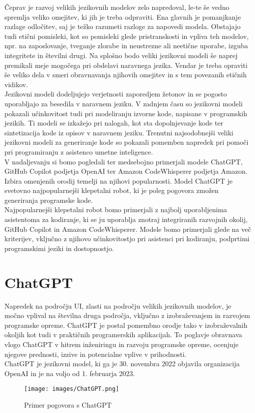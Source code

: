 \documentclass[a4paper,12pt,openright]{book}
\begin{document}
Čeprav je razvoj velikih jezikovnih modelov zelo napredoval, le-te še vedno spremlja veliko omejitev, ki jih je treba odpraviti. Ena glavnih je pomanjkanje razlage odločitev, saj je težko razumeti razloge za napovedi modela. Obstajajo tudi etični pomisleki, kot so pomisleki glede pristranskosti in vpliva teh modelov, npr. na zaposlovanje, tveganje zlorabe in neustrezne ali neetične uporabe, izguba integritete in številni drugi. Na splošno bodo veliki jezikovni modeli še naprej premikali meje mogočega pri obdelavi naravnega jezika. Vendar je treba opraviti še veliko dela v smeri obravnavanja njihovih omejitev in s tem povezanih etičnih vidikov.\cite{KASNECI2023102274} \\
Jezikovni modeli dodeljujejo verjetnosti zaporedjem žetonov in se pogosto uporabljajo za besedila v naravnem jeziku. V zadnjem času so jezikovni modeli pokazali učinkovitost tudi pri modeliranju izvorne kode, napisane v programskih jezikih. Ti modeli se izkažejo pri nalogah, kot sta dopolnjevanje kode ter sintetizacija kode iz opisov v naravnem jeziku.
Trenutni najsodobnejši veliki jezikovni modeli za generiranje kode so pokazali pomemben napredek pri pomoči pri programiranju z asistenco umetne inteligence.  \cite{vaswani2023attention} \\
V nadaljevanju si bomo pogledali ter medsebojno primerjali modele ChatGPT, GitHub Copilot podjetja OpenAI ter Amazon CodeWhisperer podjetja Amazon. Izbira omenjenih orodij temelji na njihovi popularnosti. Model ChatGPT je svetovno najpopularnejši klepetalni robot, ki je poleg pogovora zmožen generiranja programske kode\cite{wu2023brief}. \\
Najpopularnejši klepetalni robot bomo primerjali z najbolj uporabljenima asistentoma za kodiranje, ki se ju uporablja znotraj integriranih razvojnih okolij, GitHub Copilot in Amazon CodeWhisperer. Modele bomo primerjali glede na več kriterijev, vključno z njihovo učinkovitostjo pri asistenci pri kodiranju, podprtimi programskimi jeziki in dostopnostjo.

\section{ChatGPT}
Napredek na področju UI, zlasti na področju velikih jezikovnih modelov, je močno vplival na številna druga področja, vključno z izobraževanjem in razvojem programske opreme. ChatGPT je postal pomembno orodje tako v izobraževalnih okoljih kot tudi v praktičnih programerskih aplikacijah. To poglavje obravnava vlogo ChatGPT v hitrem inženiringu in razvoju programske opreme, ocenjuje njegove prednosti, izzive in potencialne vplive v prihodnosti. \\
ChatGPT je jezikovni model, ki ga je 30. novembra 2022 objavila organizacija OpenAI in je na voljo od 1. februarja 2023. \cite{openai_codex} \\
\begin{figure}[H]
    \centering
    \texttt{[image: images/ChatGPT.png]}
    \caption{Primer pogovora s ChatGPT}
    \label{fig:ChatGPT}
\end{figure}
\end{document}
